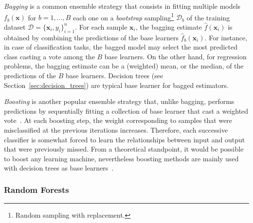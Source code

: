 	    \textit{Bagging} is a common ensemble strategy that consists in fitting multiple models $f_b(\bm{x})$ for $b=1,\dots,B$ each one on a \textit{bootstrap} sampling\footnote{ Random sampling with replacement.} $\mathcal{D}_b$ of the training dataset  $\mathcal{D}=\{\bm{x}_i, y_i\}_{i=1}^n$.
	    For each sample $\bm{x}_i$, the bagging estimate $\hat{f}(\bm{x}_i)$ is obtained by combining the predictions of the base learners $\hat{f}_b(\bm{x}_i)$. For instance, in case of classification tasks, the bagged model may select the most predicted class casting a vote among the $B$ base learners. On the other hand, for regression problems, the bagging estimate can be a (weighted) mean, or the median, of the predictions of the $B$ base learners. Decision trees (see Section~\ref{sec:decision_trees}) are typical base learner for bagged estimators.

	    \textit{Boosting} is another popular ensemble strategy that, unlike bagging, performs predictions by sequentially fitting a collection of base learner that cast a weighted vote~\citep{hastie2009elements}. At each boosting step, the weight corresponding to samples that were misclassified at the previous iterations increases. Therefore, each successive classifier is somewhat forced to learn the relationships between input and output that were previously missed. From a theoretical standpoint, it would be possible to boost any learning machine, nevertheless boosting methods are mainly used with decision trees as base learners~\cite{hastie2009elements}.

	    \subsubsection{Random Forests} \label{sec:random_forests}

